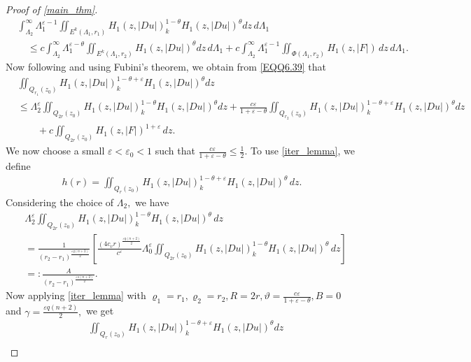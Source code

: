 \documentclass[11pt,oneside, english,reqno,twoside a4paper]{amsart}
\theoremstyle{definition}
\numberwithin{theorem}{section}
\numberwithin{equation}{section}
\begin{document}
\begin{proof}[Proof of \cref{main_thm}]
\begin{align}\label{EQQ6.39}
&\int_{\Lambda_2}^{\infty}\Lambda_1^{\varepsilon-1}\iint_{E^k\left({\Lambda_1, r_1}\right)}H_1(z, |D u|)_k^{1-\theta}H_1(z, |D u|)^\theta dz\, d\Lambda_1\nonumber\\
&\quad \leq c\int_{\Lambda_2}^{\infty} \Lambda_1^{\varepsilon-\theta}\iint_{E^k\left({\Lambda_1, r_2}\right)}H_1(z, |D u|)^\theta dz\, d\Lambda_1+ c\int_{\Lambda_2}^{\infty}\Lambda_1^{\varepsilon-1}\iint_{\Phi(\Lambda_1, r_2)}H_1(z, |F|)\,dz \, d\Lambda_1.
\end{align}
Now following \cite{2023_Gradient_Higher_Integrability_for_Degenerate_Parabolic_Double-Phase_Systems} and using Fubini's theorem, we obtain from \eqref{EQQ6.39} that
\begin{align*}
    &\iint_{Q_{r_1}(z_0)} H_1(z, |D u|)_k^{1-\theta+\varepsilon}H_1(z, |D u|)^\theta dz\\ &\leq \Lambda^{\varepsilon}_2\iint_{Q_{2r}(z_0)}H_1(z, |D u|)_k^{1-\theta}H_1(z, |D u|)^\theta dz+ \frac{c\varepsilon}{1+\varepsilon-\theta} \iint_{Q_{r_2}(z_0)}H_1(z, |D u|)_k^{1-\theta+\varepsilon}H_1(z, |D u|)^\theta dz\\
    &\qquad +c \iint_{Q_{2r}(z_0)}H_1(z, |F|)^{1+\varepsilon}\, dz.
\end{align*}
We now choose a small $\varepsilon < \varepsilon_0 < 1$ such that $\frac{c\varepsilon}{1+\varepsilon-\theta} \leq \frac{1}{2}.$ To use \cref{iter_lemma}, we define
\begin{align*}
    h(r)=\iint_{Q_{r}(z_0)} H_1(z, |D u|)_k^{1-\theta+\varepsilon} H_1(z, |D u|)^{\theta} \, dz.
\end{align*}
Considering the choice of $\Lambda_2,$ we have
\begin{align*} 
&\Lambda^{\varepsilon}_2\iint_{Q_{2r}(z_0)}H_1(z, |D u|)_k^{1-\theta}H_1(z, |D u|)^{\theta} \, dz\\
&=\frac{1}{(r_2-r_1)^{\frac{\varepsilon q(n+2)}{2}}}\left[\frac{(4c_v r)^{\frac{\varepsilon q(n+2)}{2}}}{c^{\varepsilon}} \Lambda^{\varepsilon}_0\iint_{Q_{2r}(z_0)}H_1(z, |D u|)_k^{1-\theta}H_1(z, |D u|)^{\theta} \, dz\right]\\
&=:\frac{A}{(r_2-r_1)^{\frac{\varepsilon s(n+2)}{2}}}.
\end{align*}
Now applying \cref{iter_lemma} with $\varrho_1=r_1, \varrho_2=r_2, R=2r, \vartheta=\frac{c\varepsilon}{1+\varepsilon-\theta}, B=0$ and $\gamma=\frac{\varepsilon q(n+2)}{2},$ we get
\begin{align*}
&\iint_{Q_{r}(z_0)} H_1(z, |D u|)_k^{1-\theta+\varepsilon}H_1(z, |D u|)^\theta dz \\

\end{align*}
\end{proof}
\end{document}
